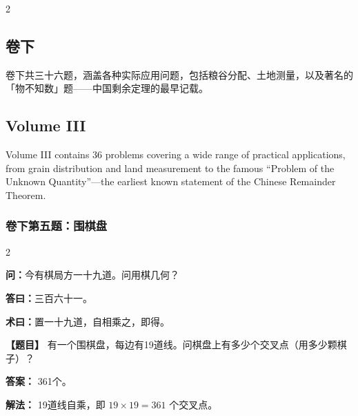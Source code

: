 \documentclass[11pt,a4paper]{article}
\begin{document}
\newpage

\begin{paracol}{2}

\begin{classicalbox}
\section*{卷下}

卷下共三十六题，涵盖各种实际应用问题，包括粮谷分配、土地测量，以及著名的「物不知数」题——中国剩余定理的最早记载。
\end{classicalbox}

\switchcolumn

\begin{modernbox}
\section*{Volume III}

Volume III contains 36 problems covering a wide range of practical applications, from grain distribution and land measurement to the famous ``Problem of the Unknown Quantity''—the earliest known statement of the Chinese Remainder Theorem.
\end{modernbox}
\end{paracol}

\vspace{0.3cm}

\subsubsection*{卷下第五题：围棋盘}
\begin{paracol}{2}
\begin{problemclassical}
\textbf{问：}今有棋局方一十九道。问用棋几何？

\textbf{答曰：}三百六十一。

\textbf{术曰：}置一十九道，自相乘之，即得。
\end{problemclassical}
\switchcolumn
\begin{problemmodern}
\textbf{【题目】} 有一个围棋盘，每边有19道线。问棋盘上有多少个交叉点（用多少颗棋子）？

\textbf{答案：} 361个。

\textbf{解法：} 19道线自乘，即 $19 \times 19 = 361$ 个交叉点。
\end{problemmodern}
\end{paracol}
\end{document}
